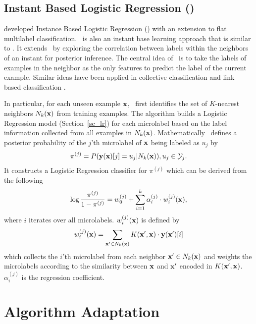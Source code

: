 {%
%
\subsection{Instant Based Logistic Regression (\iblr)} \label{sc_iblr}

\citet{Cheng09combining} developed Instance Based Logistic Regression (\iblr) with an extension to flat multilabel classification.
\iblr\ is also an instant base learning approach \citep{Aha91instance} that is similar to \mlknn.
It extends \mlknn\ by exploring the correlation between labels within the neighbors of an instant for posterior inference.
The central idea of \iblr\ is to take the labels of examples in the neighbor as the only features to predict the label of the current example.
Similar ideas have been applied in collective classification \citep{Ghamrawi05collective} and link based classification \citep{Getoor05link, Getoor07introduction}.

In particular, for each unseen example $\mathbf {x}$, \iblr\ first identifies the set of $K$-nearest neighbors $N_k(\mathbf {x})$ from training examples.
The algorithm builds a Logistic Regression model (Section~\ref{sc_lr}) for each microlabel based on the label information collected from all examples in $N_k(\mathbf {x})$.
Mathematically \iblr\ defines a posterior probability of the $j$'th microlabel of $\mathbf {x}$ being labeled as $u_j$ by
\begin{align*}
	\pi^{(j)} = P( \mathbf {y}(\mathbf {x})[j]=u_j | N_k(\mathbf {x})), u_j\in\mathcal{Y}_j.
\end{align*}
It constructs a Logistic Regression classifier for $\pi^{(j)}$ which can be derived from the following 
\begin{align*}
	\log\frac{\pi^{(j)}}{1-\pi^{(j)}} = w_0^{(j)} + \sum_{i=1}^{k}\alpha_i^{(j)}\cdot w_{i}^{(j)}(\mathbf {x}),
\end{align*}
where $i$ iterates over all microlabels.
$w_i^{(j)}(\mathbf {x})$ is defined by 
\begin{align*}
	w_i^{(j)}(\mathbf {x}) = \sum_{\mathbf {x}'\in N_k(\mathbf {x})}K(\mathbf {x}',\mathbf {x})\cdot \mathbf {y}(\mathbf {x}')[i]
\end{align*}
which collects the $i'$th microlabel from each neighbor $\mathbf {x}'\in N_k(\mathbf {x})$ and weights the microlabels according to the similarity between $\mathbf {x}$ and $\mathbf {x}'$ encoded in $K(\mathbf {x}',\mathbf {x})$.
$\alpha_i^{(j)}$ is the regression coefficient.



%
%
\section{Algorithm Adaptation}

}
